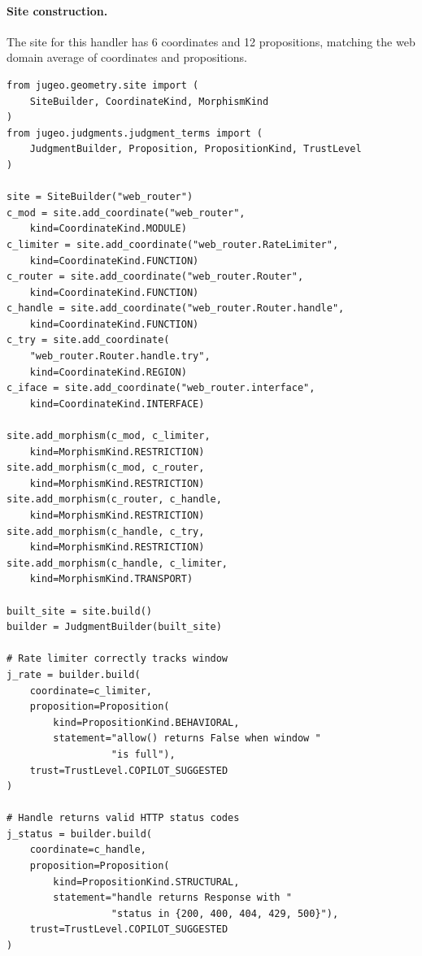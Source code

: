 \documentclass[11pt]{article}
\begin{document}
\paragraph{Site construction.}
The \JuGeo{} site for this handler has 6 coordinates and 12 propositions,
matching the web domain average of \expDomainWebAvgCoords{} coordinates
and \expDomainWebAvgProps{} propositions.

\begin{lstlisting}[style=jugeo-python,caption={JuGeo analysis of the web handler.}]
from jugeo.geometry.site import (
    SiteBuilder, CoordinateKind, MorphismKind
)
from jugeo.judgments.judgment_terms import (
    JudgmentBuilder, Proposition, PropositionKind, TrustLevel
)

site = SiteBuilder("web_router")
c_mod = site.add_coordinate("web_router",
    kind=CoordinateKind.MODULE)
c_limiter = site.add_coordinate("web_router.RateLimiter",
    kind=CoordinateKind.FUNCTION)
c_router = site.add_coordinate("web_router.Router",
    kind=CoordinateKind.FUNCTION)
c_handle = site.add_coordinate("web_router.Router.handle",
    kind=CoordinateKind.FUNCTION)
c_try = site.add_coordinate(
    "web_router.Router.handle.try",
    kind=CoordinateKind.REGION)
c_iface = site.add_coordinate("web_router.interface",
    kind=CoordinateKind.INTERFACE)

site.add_morphism(c_mod, c_limiter,
    kind=MorphismKind.RESTRICTION)
site.add_morphism(c_mod, c_router,
    kind=MorphismKind.RESTRICTION)
site.add_morphism(c_router, c_handle,
    kind=MorphismKind.RESTRICTION)
site.add_morphism(c_handle, c_try,
    kind=MorphismKind.RESTRICTION)
site.add_morphism(c_handle, c_limiter,
    kind=MorphismKind.TRANSPORT)

built_site = site.build()
builder = JudgmentBuilder(built_site)

# Rate limiter correctly tracks window
j_rate = builder.build(
    coordinate=c_limiter,
    proposition=Proposition(
        kind=PropositionKind.BEHAVIORAL,
        statement="allow() returns False when window "
                  "is full"),
    trust=TrustLevel.COPILOT_SUGGESTED
)

# Handle returns valid HTTP status codes
j_status = builder.build(
    coordinate=c_handle,
    proposition=Proposition(
        kind=PropositionKind.STRUCTURAL,
        statement="handle returns Response with "
                  "status in {200, 400, 404, 429, 500}"),
    trust=TrustLevel.COPILOT_SUGGESTED
)
\end{lstlisting}
\end{document}
